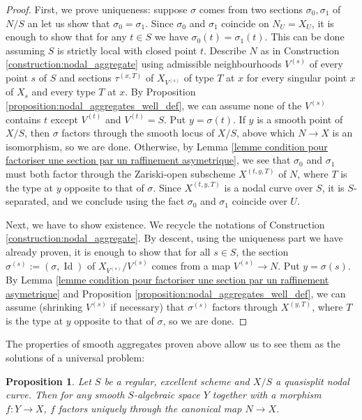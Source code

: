 \documentclass[a4paper,10pt,twoside]{article}
\DeclareMathOperator{\Id}{Id}
\newtheorem{prop}[thm]{Proposition}
\theoremstyle{definition}
\theoremstyle{remark}
\begin{document}
\begin{proof}
First, we prove uniqueness: suppose $\sigma$ comes from two sections $\sigma_0,\sigma_1$ of $N/S$ an let us show that $\sigma_0=\sigma_1$. Since $\sigma_0$ and $\sigma_1$ coincide on $N_U=X_U$, it is enough to show that for any $t\in S$ we have $\sigma_0(t)=\sigma_1(t)$. This can be done assuming $S$ is strictly local with closed point $t$. Describe $N$ as in Construction \ref{construction:nodal_aggregate} using admissible neighbourhoods $V^{(s)}$ of every point $s$ of $S$ and sections $\tau^{(x,T)}$ of $X_{V^{(s)}}$ of type $T$ at $x$ for every singular point $x$ of $X_{s}$ and every type $T$ at $x$. By Proposition \ref{proposition:nodal_aggregates_well_def}, we can assume none of the $V^{(s)}$ contains $t$ except $V^{(t)}$ and $V^{(t)}=S$. Put $y=\sigma(t)$. If $y$ is a smooth point of $X/S$, then $\sigma$ factors through the smooth locus of $X/S$, above which $N\to X$ is an isomorphism, so we are done. Otherwise, by Lemma \ref{lemme condition pour factoriser une section par un raffinement asymetrique}, we see that $\sigma_0$ and $\sigma_1$ must both factor through the Zariski-open subscheme $X^{(t,y,T)}$ of $N$, where $T$ is the type at $y$ opposite to that of $\sigma$. Since $X^{(t,y,T)}$ is a nodal curve over $S$, it is $S$-separated, and we conclude using the fact $\sigma_0$ and $\sigma_1$ coincide over $U$.

Next, we have to show existence. We recycle the notations of Construction \ref{construction:nodal_aggregate}. By descent, using the uniqueness part we have already proven, it is enough to show that for all $s\in S$, the section $\sigma^{(s)}:=(\sigma,\Id)$ of $X_{V^{(s)}}/V^{(s)}$ comes from a map $V^{(s)}\to N$. Put $y=\sigma(s)$. By Lemma \ref{lemme condition pour factoriser une section par un raffinement asymetrique} and Proposition \ref{proposition:nodal_aggregates_well_def}, we can assume (shrinking $V^{(s)}$ if necessary) that $\sigma^{(s)}$ factors through $X^{(y,T)}$, where $T$ is the type at $y$ opposite to that of $\sigma$, so we are done.
\end{proof}

The properties of smooth aggregates proven above allow us to see them as the solutions of a universal problem:

\begin{prop}\label{proposition:universal_ppty_of_nodal_aggregates}
Let $S$ be a regular, excellent scheme and $X/S$ a quasisplit nodal curve. Then for any smooth $S$-algebraic space $Y$ together with a morphism $f\colon Y\to X$, $f$ factors uniquely through the canonical map $N\to X$.
\end{prop}
\end{document}

